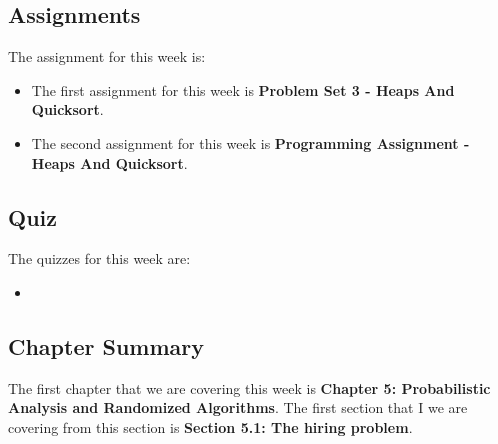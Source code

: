 \subsection{Assignments}

The assignment for this week is:

\begin{itemize}
    \item The first assignment for this week is \textbf{Problem Set 3 - Heaps And Quicksort}. 
    \item The second assignment for this week is \textbf{Programming Assignment - Heaps And Quicksort}. 
\end{itemize}

\subsection{Quiz}

The quizzes for this week are:

\begin{itemize}
    \item {} \textbullet {} 
\end{itemize}

\subsection{Chapter Summary}

The first chapter that we are covering this week is \textbf{Chapter 5: Probabilistic Analysis and Randomized Algorithms}. The first section that I we are covering from this section is \textbf{Section 5.1: The hiring problem}.


